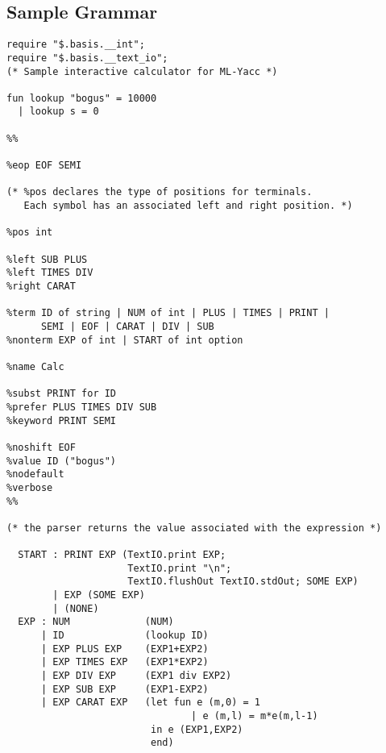 \documentclass{article}
\begin{document}
\subsection{Sample Grammar}
\begin{tt}
\begin{verbatim}
require "$.basis.__int";
require "$.basis.__text_io";
(* Sample interactive calculator for ML-Yacc *)

fun lookup "bogus" = 10000
  | lookup s = 0

%%

%eop EOF SEMI

(* %pos declares the type of positions for terminals.
   Each symbol has an associated left and right position. *)

%pos int

%left SUB PLUS
%left TIMES DIV
%right CARAT

%term ID of string | NUM of int | PLUS | TIMES | PRINT |
      SEMI | EOF | CARAT | DIV | SUB
%nonterm EXP of int | START of int option

%name Calc

%subst PRINT for ID
%prefer PLUS TIMES DIV SUB
%keyword PRINT SEMI

%noshift EOF
%value ID ("bogus")
%nodefault
%verbose
%%

(* the parser returns the value associated with the expression *)

  START : PRINT EXP (TextIO.print EXP;
                     TextIO.print "\n";
                     TextIO.flushOut TextIO.stdOut; SOME EXP)
        | EXP (SOME EXP)
        | (NONE)
  EXP : NUM             (NUM)
      | ID              (lookup ID)
      | EXP PLUS EXP    (EXP1+EXP2)
      | EXP TIMES EXP   (EXP1*EXP2)
      | EXP DIV EXP     (EXP1 div EXP2)
      | EXP SUB EXP     (EXP1-EXP2)
      | EXP CARAT EXP   (let fun e (m,0) = 1
                                | e (m,l) = m*e(m,l-1)
                         in e (EXP1,EXP2)       
                         end)
\end{verbatim}
\end{tt}
\end{document}

